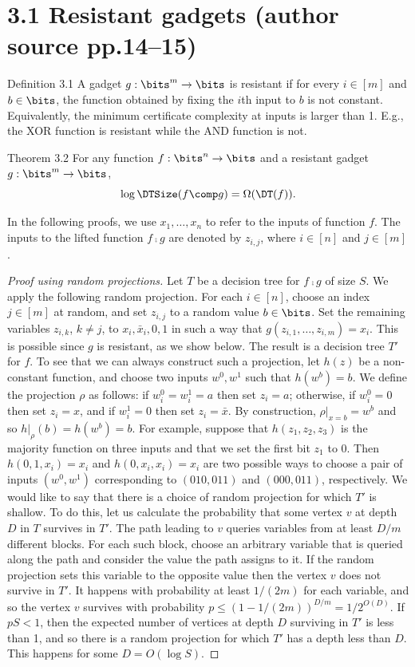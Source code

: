 \section*{3.1 Resistant gadgets (author source pp.14--15)}
\begin{originalresult}{Definition 3.1}
A gadget $g:\bits^m\to\bits$ is resistant if for every $i\in[m]$ and $b\in\bits$, the function obtained by fixing the $i$th input to $b$ is not constant. Equivalently, the minimum certificate complexity at inputs is larger than 1. E.g., the XOR function is resistant while the AND function is not.
\end{originalresult}
\begin{originalresult}{Theorem 3.2}
For any function $f:\bits^n\to\bits$ and a resistant gadget $g:\bits^m\to\bits$,
\[\log\DTSize(f\comp g)=\Omega(\DT(f)).\]
\end{originalresult}
In the following proofs, we use $x_1,\ldots,x_n$ to refer to the inputs of function $f$. The inputs to the lifted function $f\comp g$ are denoted by $z_{i,j}$, where $i\in[n]$ and $j\in[m]$.
\begin{proof}[Proof using random projections]
Let $T$ be a decision tree for $f\comp g$ of size $S$. We apply the following random projection. For each $i\in[n]$, choose an index $j\in[m]$ at random, and set $z_{i,j}$ to a random value $b\in\bits$. Set the remaining variables $z_{i,k}$, $k\ne j$, to $x_i,\bar x_i,0,1$ in such a way that $g(z_{i,1},\ldots,z_{i,m})=x_i$. This is possible since $g$ is resistant, as we show below. The result is a decision tree $T'$ for $f$.
To see that we can always construct such a projection, let $h(z)$ be a non-constant function, and choose two inputs $w^0,w^1$ such that $h(w^b)=b$. We define the projection $\rho$ as follows: if $w_i^0=w_i^1=a$ then set $z_i=a$; otherwise, if $w_i^0=0$ then set $z_i=x$, and if $w_i^1=0$ then set $z_i=\bar x$. By construction, $\rho|_{x=b}=w^b$ and so $h|_\rho(b)=h(w^b)=b$.
For example, suppose that $h(z_1,z_2,z_3)$ is the majority function on three inputs and that we set the first bit $z_1$ to 0. Then $h(0,1,x_i)=x_i$ and $h(0,x_i,x_i)=x_i$ are two possible ways to choose a pair of inputs $(w^0,w^1)$ corresponding to $(010,011)$ and $(000,011)$, respectively.
We would like to say that there is a choice of random projection for which $T'$ is shallow. To do this, let us calculate the probability that some vertex $v$ at depth $D$ in $T$ survives in $T'$. The path leading to $v$ queries variables from at least $D/m$ different blocks. For each such block, choose an arbitrary variable that is queried along the path and consider the value the path assigns to it. If the random projection sets this variable to the opposite value then the vertex $v$ does not survive in $T'$. It happens with probability at least $1/(2m)$ for each variable, and so the vertex $v$ survives with probability $p\le(1-1/(2m))^{D/m}=1/2^{O(D)}$.
If $pS<1$, then the expected number of vertices at depth $D$ surviving in $T'$ is less than 1, and so there is a random projection for which $T'$ has a depth less than $D$. This happens for some $D=O(\log S)$.
\end{proof}
